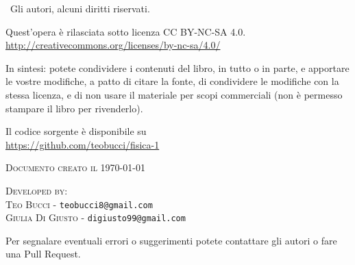 
\textcopyright \ Gli autori, alcuni diritti riservati.

Quest'opera è rilasciata sotto licenza CC BY-NC-SA 4.0.\\
\url{http://creativecommons.org/licenses/by-nc-sa/4.0/}

In sintesi: potete condividere i contenuti del libro, in tutto o in parte, e apportare le vostre modifiche, a patto di citare la fonte, di condividere le modifiche con la stessa licenza, e di non usare il materiale per scopi commerciali (non è permesso stampare il libro per rivenderlo).

Il codice sorgente \latex è disponibile su \\
\url{https://github.com/teobucci/fisica-1}


\textsc{Documento creato il \today}


\textsc{Developed by:}\\
\textsc{Teo Bucci} - \texttt{teobucci8@gmail.com}\\
\textsc{Giulia Di Giusto} - \texttt{digiusto99@gmail.com}

Per segnalare eventuali errori o suggerimenti potete contattare gli autori o fare una Pull Request.

